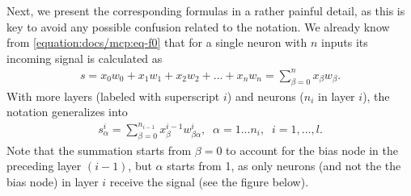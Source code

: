 \documentclass[a4paper,12pt,polish]{jupyterBook}
\begin{document}
\sphinxAtStartPar
Next, we present the corresponding formulas in a rather painful detail, as this is key to avoid any possible confusion related to the notation.
We already know from \eqref{equation:docs/mcp:eq-f0} that for a single neuron with \(n\) inputs its incoming signal is calculated as
\begin{equation*}
\begin{split}s = x_0 w_0 + x_1 w_1 + x_2 w_2 + ... + x_n w_n = \sum_{\beta=0}^n x_\beta w_\beta .\end{split}
\end{equation*}
\sphinxAtStartPar
With more layers (labeled with superscript \(i\)) and neurons (\(n_i\) in layer \(i\)),
the notation generalizes into
\begin{equation*}
\begin{split}
s^i_\alpha=\sum_{\beta=0}^{n_{i-1}} x^{i-1}_\beta w^i_{\beta \alpha}, \;\; \alpha=1\dots n_i, \;\; i=1,\dots,l.
\end{split}
\end{equation*}
\sphinxAtStartPar
Note that the summation starts from \(\beta=0\) to account for the bias node in the preceding layer \((i-1)\), but \(\alpha\) starts from 1, as only neurons (and not the the bias node) in layer \(i\) receive the signal (see the figure below).
\end{document}
